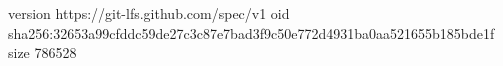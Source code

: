 version https://git-lfs.github.com/spec/v1
oid sha256:32653a99cfddc59de27c3c87e7bad3f9c50e772d4931ba0aa521655b185bde1f
size 786528
